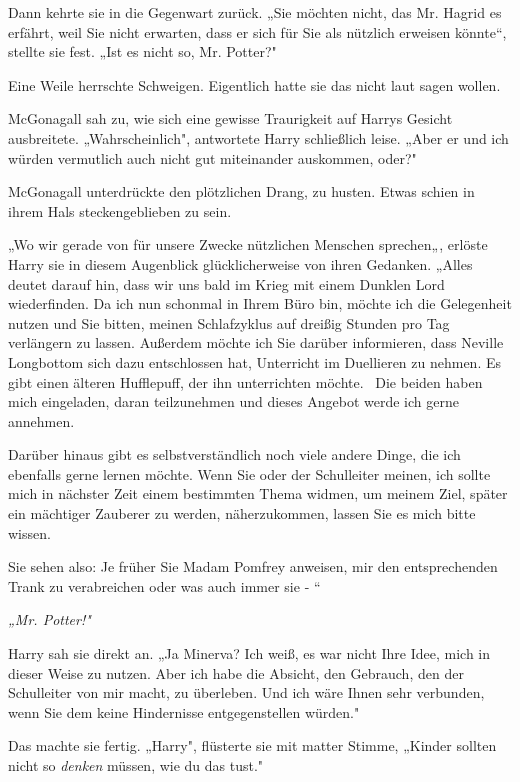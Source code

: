 {Dann kehrte sie in die Gegenwart zurück. „Sie möchten nicht, das Mr. Hagrid es erfährt, weil Sie nicht erwarten, dass er sich für Sie als nützlich erweisen könnte“, stellte sie fest. „Ist es nicht so, Mr. Potter?"

Eine Weile herrschte Schweigen. Eigentlich hatte sie das nicht laut sagen wollen.

McGonagall sah zu, wie sich eine gewisse Traurigkeit auf Harrys Gesicht ausbreitete. „Wahrscheinlich", antwortete Harry schließlich leise. „Aber er und ich würden vermutlich auch nicht gut miteinander auskommen, oder?"

McGonagall unterdrückte den plötzlichen Drang, zu husten. Etwas schien in ihrem Hals steckengeblieben zu sein.

„Wo wir gerade von für unsere Zwecke nützlichen Menschen sprechen„, erlöste Harry sie in diesem Augenblick glücklicherweise von ihren Gedanken. „Alles deutet darauf hin, dass wir uns bald im Krieg mit einem Dunklen Lord wiederfinden. Da ich nun schonmal in Ihrem Büro bin, möchte ich die Gelegenheit nutzen und Sie bitten, meinen Schlafzyklus auf dreißig Stunden pro Tag verlängern zu lassen. Außerdem möchte ich Sie darüber informieren, dass Neville Longbottom sich dazu entschlossen hat, Unterricht im Duellieren zu nehmen. Es gibt einen älteren Hufflepuff, der ihn unterrichten möchte. ~Die beiden haben mich eingeladen, daran teilzunehmen und dieses Angebot werde ich gerne annehmen.

Darüber hinaus gibt es selbstverständlich noch viele andere Dinge, die ich ebenfalls gerne lernen möchte. Wenn Sie oder der Schulleiter meinen, ich sollte mich in nächster Zeit einem bestimmten Thema widmen, um meinem Ziel, später ein mächtiger Zauberer zu werden, näherzukommen, lassen Sie es mich bitte wissen.

Sie sehen also: Je früher Sie Madam Pomfrey anweisen, mir den entsprechenden Trank zu verabreichen oder was auch immer sie - “

\emph{\emph{„Mr. Potter!"}}

Harry sah sie direkt an. „Ja Minerva? Ich weiß, es war nicht Ihre Idee, mich in dieser Weise zu nutzen. Aber ich habe die Absicht, den Gebrauch, den der Schulleiter von mir macht, zu überleben. Und ich wäre Ihnen sehr verbunden, wenn Sie dem keine Hindernisse entgegenstellen würden."

Das machte sie fertig. „Harry", flüsterte sie mit matter Stimme, „Kinder sollten nicht so \emph{denken} müssen, wie du das tust."

}

